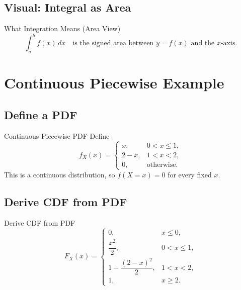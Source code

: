 \documentclass[aspectratio=169]{beamer}
\begin{document}
\subsection{Visual: Integral as Area}
\begin{frame}{What Integration Means (Area View)}
  \[
    \int_a^b f(x)\,dx
    \quad\text{is the signed area between }y=f(x)\text{ and the }x\text{-axis.}
  \]
  \vspace{2mm}
  \begin{center}
  \end{center}
\end{frame}

\section{Continuous Piecewise Example}

\subsection{Define a PDF}
\begin{frame}{Continuous Piecewise PDF}
  Define
  \[
    f_X(x)=
    \begin{cases}
      x, & 0<x\le 1,\\
      2-x, & 1<x<2,\\
      0, & \text{otherwise}.
    \end{cases}
  \]
  This is a continuous distribution, so \(f(X=x)=0\) for every fixed \(x\).
\end{frame}

\subsection{Derive CDF from PDF}
\begin{frame}{Derive CDF from PDF}
  \[
    F_X(x)=
    \begin{cases}
      0, & x\le 0,\\
      \dfrac{x^2}{2}, & 0<x\le 1,\\
      1-\dfrac{(2-x)^2}{2}, & 1<x<2,\\
      1, & x\ge 2.
    \end{cases}
  \]
\end{frame}
\end{document}
